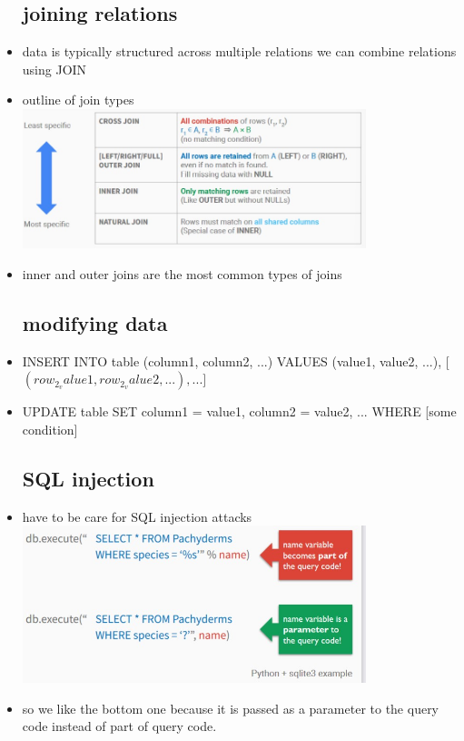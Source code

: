 \documentclass{article}
\begin{document}
\begin{itemize}
\subsection{joining relations}
\item data is typically structured across multiple relations 
\itme we can combine relations using JOIN
\item outline of join types \\\includegraphics[width=10cm]{lecture notes/week 2/immages/w_1_4.jpg}
\item inner and outer joins are the most common types of joins
\subsection{modifying data}
\item INSERT INTO table (column1, column2, ...)
VALUES (value1, value2, ...),
[$(row_2_value1, row_2_value2, ...), ...]$
\item UPDATE table
SET column1 = value1, column2 = value2, ...
WHERE [some condition]

\subsection{SQL injection}
\item have to be care for SQL injection attacks 
\\\includegraphics[width=10cm]{lecture notes/week 2/immages/w_1_5.jpg}
\item so we like the bottom one because it is passed as a parameter to the query code instead of part of query code. 


\end{itemize}
\end{document}
